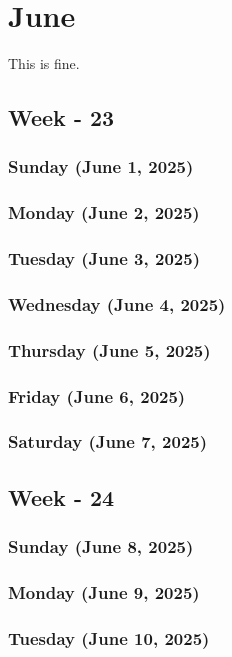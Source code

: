 \chapter{June}

This is fine.\cite{zhou2015}
\section{Week - 23}
\subsection*{Sunday (June 1, 2025)}
\subsection*{Monday (June 2, 2025)}
\subsection*{Tuesday (June 3, 2025)}
\subsection*{Wednesday (June 4, 2025)}
\subsection*{Thursday (June 5, 2025)}
\subsection*{Friday (June 6, 2025)}
\subsection*{Saturday (June 7, 2025)}

\section{Week - 24}
\subsection*{Sunday (June 8, 2025)}
\subsection*{Monday (June 9, 2025)}
\subsection*{Tuesday (June 10, 2025)}
